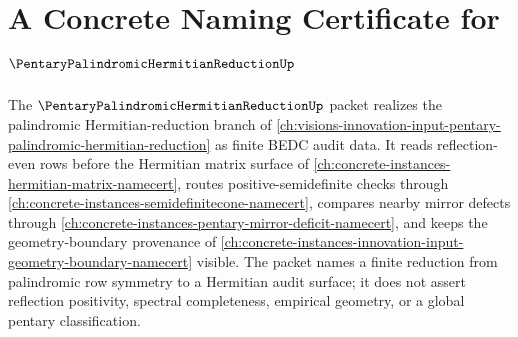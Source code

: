 \chapter{A Concrete Naming Certificate for $\PentaryPalindromicHermitianReductionUp$}
\label{ch:concrete-instances-pentary-palindromic-hermitian-reduction-namecert}

The $\PentaryPalindromicHermitianReductionUp$ packet realizes the palindromic Hermitian-reduction branch of \autoref{ch:visions-innovation-input-pentary-palindromic-hermitian-reduction} as finite BEDC audit data. It reads reflection-even rows before the Hermitian matrix surface of \autoref{ch:concrete-instances-hermitian-matrix-namecert}, routes positive-semidefinite checks through \autoref{ch:concrete-instances-semidefinitecone-namecert}, compares nearby mirror defects through \autoref{ch:concrete-instances-pentary-mirror-deficit-namecert}, and keeps the geometry-boundary provenance of \autoref{ch:concrete-instances-innovation-input-geometry-boundary-namecert} visible. The packet names a finite reduction from palindromic row symmetry to a Hermitian audit surface; it does not assert reflection positivity, spectral completeness, empirical geometry, or a global pentary classification.

